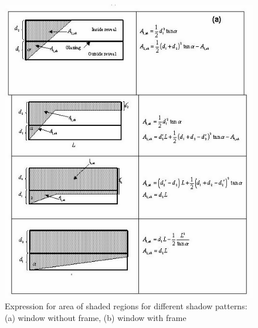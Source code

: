 \begin{figure}[htbp]
\centering
\includegraphics{media/image1605.png}
\caption{Expression for area of shaded regions for different shadow patterns: (a) window without frame, (b) window with frame}
\end{figure}

